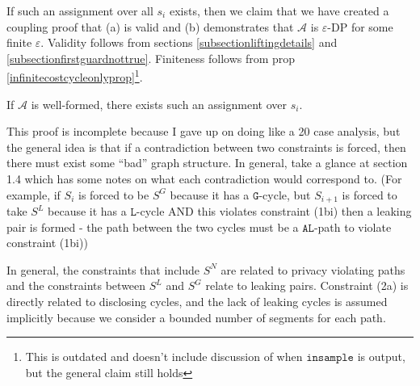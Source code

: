 \documentclass[12pt]{article}
\theoremstyle{definition}
\begin{document}
If such an assignment over all $s_i$ exists, then we claim that we have created a coupling proof that (a) is valid and (b) demonstrates that $\mathcal{A}$ is $\varepsilon$-DP for some finite $\varepsilon$. Validity follows from sections \ref{subsectionliftingdetails} and \ref{subsectionfirstguardnottrue}. Finiteness follows from prop \ref{infinitecostcycleonlyprop}\footnote{This is outdated and doesn't include discussion of when $\texttt{insample}$ is output, but the general claim still holds}.

\begin{thm}
	If $\mathcal{A}$ is well-formed, there exists such an assignment over $s_i$.
\end{thm}

{\color{red} This proof is incomplete because I gave up on doing like a 20 case analysis, but the general idea is that if a contradiction between two constraints is forced, then there must exist some ``bad'' graph structure. In general, take a glance at section 1.4 which has some notes on what each contradiction would correspond to. 
(For example, if $S_i$ is forced to be $S^G$ because it has a $\texttt{G}$-cycle, but $S_{i+1}$ is forced to take $S^L$ because it has a $\texttt{L}$-cycle AND this violates constraint (1bi) then a leaking pair is formed - the path between the two cycles must be a $\texttt{AL}$-path to violate constraint (1bi))

In general, the constraints that include $S^N$ are related to privacy violating paths and the constraints between $S^L$ and $S^G$ relate to leaking pairs. Constraint (2a) is directly related to disclosing cycles, and the lack of leaking cycles is assumed implicitly because we consider a bounded number of segments for each path.}
\end{document}
